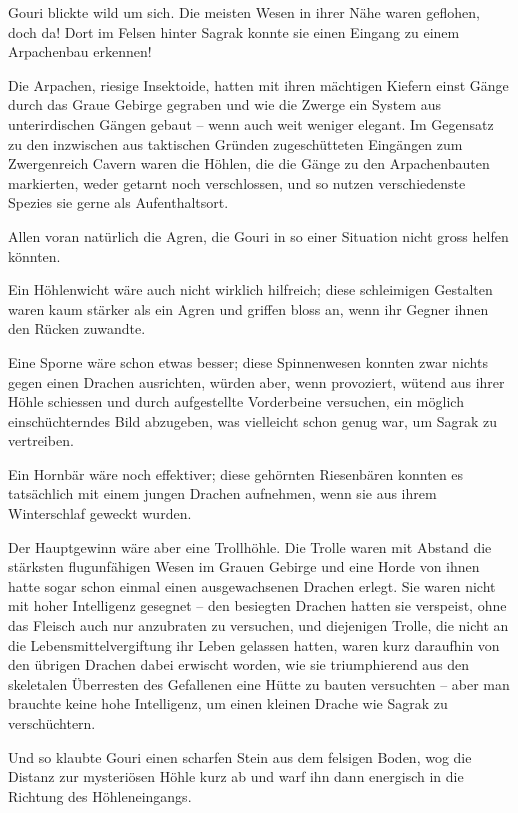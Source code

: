 Gouri blickte wild um sich. Die meisten Wesen in ihrer Nähe waren geflohen, doch da! Dort im Felsen hinter Sagrak konnte sie einen Eingang zu einem Arpachenbau erkennen!

Die Arpachen, riesige Insektoide, hatten mit ihren mächtigen Kiefern einst Gänge durch das Graue Gebirge gegraben und wie die Zwerge ein System aus unterirdischen Gängen gebaut – wenn auch weit weniger elegant. Im Gegensatz zu den inzwischen aus taktischen Gründen zugeschütteten Eingängen zum Zwergenreich Cavern waren die Höhlen, die die Gänge zu den Arpachenbauten markierten, weder getarnt noch verschlossen, und so nutzen verschiedenste Spezies sie gerne als Aufenthaltsort.

Allen voran natürlich die Agren, die Gouri in so einer Situation nicht gross helfen könnten.

Ein Höhlenwicht wäre auch nicht wirklich hilfreich; diese schleimigen Gestalten waren kaum stärker als ein Agren und griffen bloss an, wenn ihr Gegner ihnen den Rücken zuwandte.

Eine Sporne wäre schon etwas besser; diese Spinnenwesen konnten zwar nichts gegen einen Drachen ausrichten, würden aber, wenn provoziert, wütend aus ihrer Höhle schiessen und durch aufgestellte Vorderbeine versuchen, ein möglich einschüchterndes Bild abzugeben, was vielleicht schon genug war, um Sagrak zu vertreiben.

Ein Hornbär wäre noch effektiver; diese gehörnten Riesenbären konnten es tatsächlich mit einem jungen Drachen aufnehmen, wenn sie aus ihrem Winterschlaf geweckt wurden.

Der Hauptgewinn wäre aber eine Trollhöhle. Die Trolle waren mit Abstand die stärksten flugunfähigen Wesen im Grauen Gebirge und eine Horde von ihnen hatte sogar schon einmal einen ausgewachsenen Drachen erlegt. Sie waren nicht mit hoher Intelligenz gesegnet – den besiegten Drachen hatten sie verspeist, ohne das Fleisch auch nur anzubraten zu versuchen, und diejenigen Trolle, die nicht an die Lebensmittelvergiftung ihr Leben gelassen hatten, waren kurz daraufhin von den übrigen Drachen dabei erwischt worden, wie sie triumphierend aus den skeletalen Überresten des Gefallenen eine Hütte zu bauten versuchten – aber man brauchte keine hohe Intelligenz, um einen kleinen Drache wie Sagrak zu verschüchtern.

Und so klaubte Gouri einen scharfen Stein aus dem felsigen Boden, wog die Distanz zur mysteriösen Höhle kurz ab und warf ihn dann energisch in die Richtung des Höhleneingangs.


